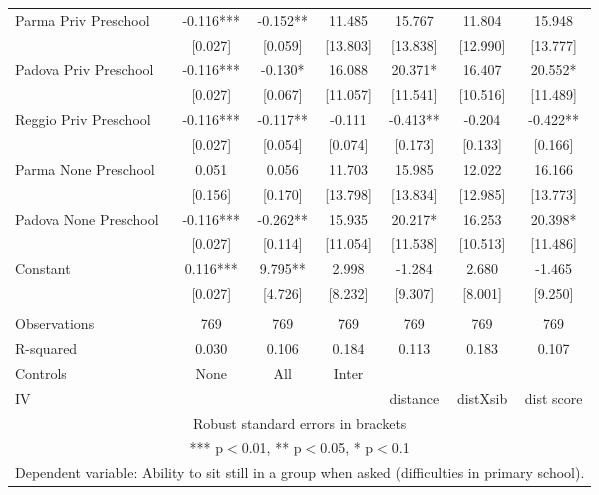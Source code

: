 \begin{tabular}{lcccccc}
Parma Priv Preschool & -0.116*** & -0.152** & 11.485 & 15.767 & 11.804 & 15.948 \\
 & [0.027] & [0.059] & [13.803] & [13.838] & [12.990] & [13.777] \\
Padova Priv Preschool & -0.116*** & -0.130* & 16.088 & 20.371* & 16.407 & 20.552* \\
 & [0.027] & [0.067] & [11.057] & [11.541] & [10.516] & [11.489] \\
Reggio Priv Preschool & -0.116*** & -0.117** & -0.111 & -0.413** & -0.204 & -0.422** \\
 & [0.027] & [0.054] & [0.074] & [0.173] & [0.133] & [0.166] \\
Parma None Preschool & 0.051 & 0.056 & 11.703 & 15.985 & 12.022 & 16.166 \\
 & [0.156] & [0.170] & [13.798] & [13.834] & [12.985] & [13.773] \\
Padova None Preschool & -0.116*** & -0.262** & 15.935 & 20.217* & 16.253 & 20.398* \\
 & [0.027] & [0.114] & [11.054] & [11.538] & [10.513] & [11.486] \\
Constant & 0.116*** & 9.795** & 2.998 & -1.284 & 2.680 & -1.465 \\
 & [0.027] & [4.726] & [8.232] & [9.307] & [8.001] & [9.250] \\
 &  &  &  &  &  &  \\
Observations & 769 & 769 & 769 & 769 & 769 & 769 \\
R-squared & 0.030 & 0.106 & 0.184 & 0.113 & 0.183 & 0.107 \\
Controls & None & All & Inter &  &  &  \\
 IV &  &  &  & distance & distXsib & dist score \\ \hline
\multicolumn{7}{c}{ Robust standard errors in brackets} \\
\multicolumn{7}{c}{ *** p$<$0.01, ** p$<$0.05, * p$<$0.1} \\
\multicolumn{7}{c}{ Dependent variable: Ability to sit still in a group when asked (difficulties in primary school).} \\
\end{tabular}
